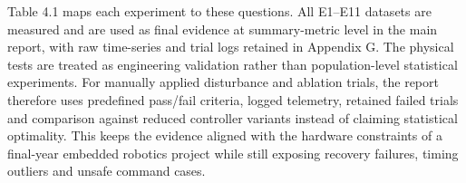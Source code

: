 \documentclass[12pt, a4paper]{article}
\begin{document}
Table 4.1 maps each experiment to these questions. All E1--E11 datasets are measured and are used as final evidence at summary-metric level in the main report, with raw time-series and trial logs retained in Appendix G. The physical tests are treated as engineering validation rather than population-level statistical experiments. For manually applied disturbance and ablation trials, the report therefore uses predefined pass/fail criteria, logged telemetry, retained failed trials and comparison against reduced controller variants instead of claiming statistical optimality. This keeps the evidence aligned with the hardware constraints of a final-year embedded robotics project while still exposing recovery failures, timing outliers and unsafe command cases.


\begingroup
\singlespacing
\scriptsize
\setlength{\tabcolsep}{2pt}
\renewcommand{\arraystretch}{1.15}
\end{document}
